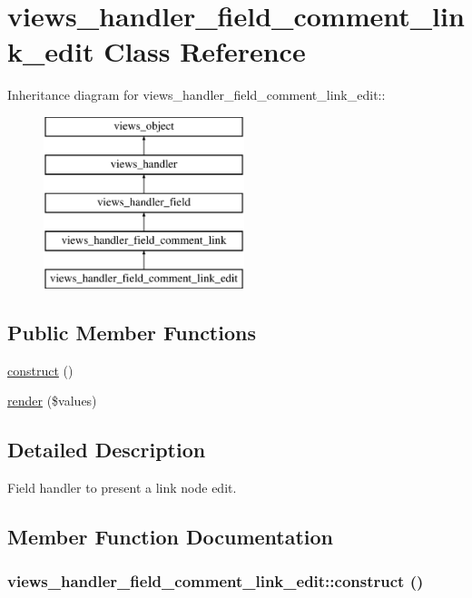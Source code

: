 \hypertarget{classviews__handler__field__comment__link__edit}{
\section{views\_\-handler\_\-field\_\-comment\_\-link\_\-edit Class Reference}
\label{classviews__handler__field__comment__link__edit}
}
Inheritance diagram for views\_\-handler\_\-field\_\-comment\_\-link\_\-edit::\begin{figure}[H]
\begin{center}
\leavevmode
\includegraphics[height=5cm]{classviews__handler__field__comment__link__edit}
\end{center}
\end{figure}
\subsection*{Public Member Functions}
\begin{CompactItemize}
\item 
\hyperlink{classviews__handler__field__comment__link__edit_b18ca319bec910ab7771786522718d0e}{construct} ()
\item 
\hyperlink{classviews__handler__field__comment__link__edit_e48ccec698d22ef50b68d4fd48ed1676}{render} (\$values)
\end{CompactItemize}


\subsection{Detailed Description}
Field handler to present a link node edit. 

\subsection{Member Function Documentation}
\hypertarget{classviews__handler__field__comment__link__edit_b18ca319bec910ab7771786522718d0e}{
\subsubsection[{construct}]{\setlength{\rightskip}{0pt plus 5cm}views\_\-handler\_\-field\_\-comment\_\-link\_\-edit::construct ()}}
\label{classviews__handler__field__comment__link__edit_b18ca319bec910ab7771786522718d0e}



